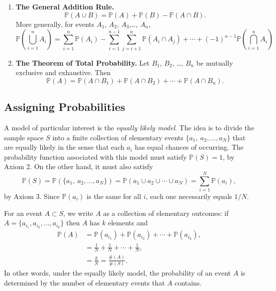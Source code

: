 \documentclass[captions=tableheading]{scrbook}
\begin{document}
\begin{enumerate}
\item \textbf{The General Addition Rule.}
  \begin{equation}
  \mathbb{P}(A\cup B)=\mathbb{P}(A)+\mathbb{P}(B)-\mathbb{P}(A\cap B).\label{eq-general-addition-rule-1}
  \end{equation}
  More generally, for events \(A_{1}\), \(A_{2}\), \(A_{3}\),\ldots{}, \(A_{n}\),
  \begin{equation}
  \mathbb{P}\left(\bigcup_{i=1}^{n}A_{i}\right)=\sum_{i=1}^{n}\mathbb{P}(A_{i})-\sum_{i=1}^{n-1}\sum_{j=i+1}^{n}\mathbb{P}(A_{i}\cap A_{j})+\cdots+(-1)^{n-1}\mathbb{P}\left(\bigcap_{i=1}^{n}A_{i}\right)
  \end{equation}
\item \textbf{The Theorem of Total Probability.} 
  Let \(B_{1}\), \(B_{2}\), \ldots{}, \(B_{n}\) be mutually exclusive and exhaustive. Then
  \begin{equation}
  \mathbb{P}(A)=\mathbb{P}(A\cap B_{1})+\mathbb{P}(A\cap B_{2})+\cdots+\mathbb{P}(A\cap B_{n}).\label{eq-theorem-total-probability}
  \end{equation}
\end{enumerate}
\subsection{Assigning Probabilities}
\label{sec-4-4-3}


A model of particular interest is the \emph{equally likely model}. The idea is to divide the sample space \(S\) into a finite collection of elementary events \( \{ a_{1},\ a_{2}, \ldots, a_{N} \} \) that are equally likely in the sense that each \(a_{i}\) has equal chances of occurring. The probability function associated with this model must satisfy \(\mathbb{P}(S)=1\), by Axiom 2. On the other hand, it must also satisfy
\[
\mathbb{P}(S)=\mathbb{P}( \{ a_{1},\ a_{2},\ldots,a_{N} \} )=\mathbb{P}(a_{1}\cup a_{2}\cup\cdots\cup a_{N})=\sum_{i=1}^{N}\mathbb{P}(a_{i}),
\]
by Axiom 3. Since \(\mathbb{P}(a_{i})\) is the same for all \(i\), each one necessarily equals \(1/N\). 

For an event \(A\subset S\), we write \(A\) as a collection of elementary outcomes: if \( A = \{ a_{i_{1}}, a_{i_{2}}, \ldots, a_{i_{k}} \} \) then \(A\) has \(k\) elements and 
\begin{align*}
\mathbb{P}(A) & =\mathbb{P}(a_{i_{1}})+\mathbb{P}(a_{i_{2}})+\cdots+\mathbb{P}(a_{i_{k}}),\\
 & =\frac{1}{N}+\frac{1}{N}+\cdots+\frac{1}{N},\\  & =\frac{k}{N}=\frac{\#(A)}{\#(S)}.
\end{align*}
In other words, under the equally likely model, the probability of an event \(A\) is determined by the number of elementary events that \(A\) contains. 
\end{document}

